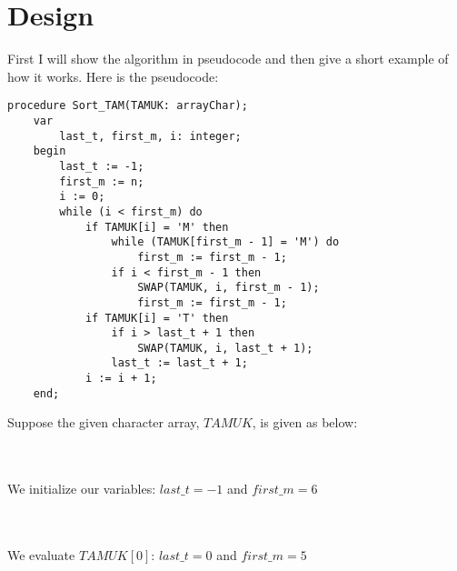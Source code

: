 \documentclass[12pt]{report}
\begin{document}
\chapter{Design}
\label{chapter:design}
First I will show the algorithm in pseudocode and then give a short example of how it works.
Here is the pseudocode:
\begin{verbatim}
procedure Sort_TAM(TAMUK: arrayChar);
    var
        last_t, first_m, i: integer;
    begin
        last_t := -1;
        first_m := n;
        i := 0;
        while (i < first_m) do
            if TAMUK[i] = 'M' then
                while (TAMUK[first_m - 1] = 'M') do
                    first_m := first_m - 1;
                if i < first_m - 1 then
                    SWAP(TAMUK, i, first_m - 1);
                    first_m := first_m - 1;
            if TAMUK[i] = 'T' then
                if i > last_t + 1 then
                    SWAP(TAMUK, i, last_t + 1);
                last_t := last_t + 1;
            i := i + 1;
    end;
\end{verbatim}
\pagebreak
Suppose the given character array, $TAMUK$, is given as below:\\\\
\\We initialize our variables: $last\_t=-1$ and $first\_m=6$\\\\
\\We evaluate $TAMUK[0]$: $last\_t=0$ and $first\_m=5$\\\\
\end{document}
